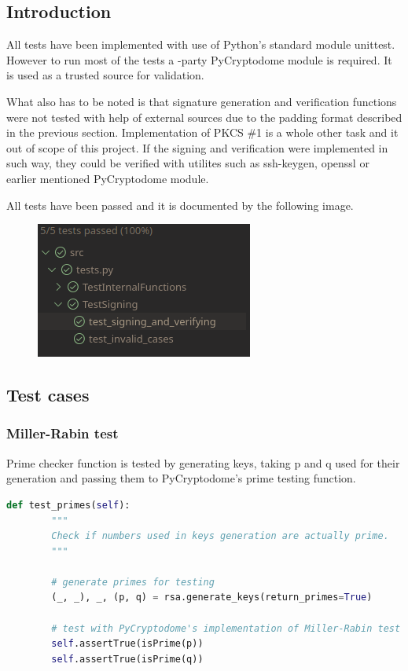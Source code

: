 \documentclass{article}
\begin{document}
\subsection{Introduction}
All tests have been implemented with use of Python's standard module unittest.
However to run most of the tests a -party PyCryptodome module is required.
It is used as a trusted source for validation.

What also has to be noted is that signature generation and verification functions were not tested
with help of external sources due to the padding format described in the previous section.
Implementation of PKCS \#1 is a whole other task and it out of scope of this project.
If the signing and verification were implemented in such way, they could be verified with utilites
such as ssh-keygen, openssl or earlier mentioned PyCryptodome module.

All tests have been passed and it is documented by the following image.

\newpage

\begin{figure}[h!] %
    \centering
        \includegraphics[width=0.5\linewidth]{passed_tests.png}
\end{figure}


\subsection{Test cases}
\subsubsection{Miller-Rabin test}
Prime checker function is tested by generating keys, taking p and q used for their generation
and passing them to PyCryptodome's prime testing function.

\small

\begin{lstlisting}[language=Python]
    def test_primes(self):
        """
        Check if numbers used in keys generation are actually prime.
        """

        # generate primes for testing
        (_, _), _, (p, q) = rsa.generate_keys(return_primes=True)

        # test with PyCryptodome's implementation of Miller-Rabin test
        self.assertTrue(isPrime(p))
        self.assertTrue(isPrime(q))
\end{lstlisting}
\end{document}
